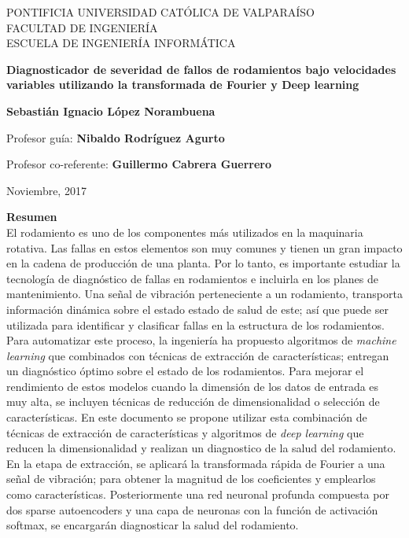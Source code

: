 \documentclass[12pt]{article}%
\begin{document}
\thispagestyle{empty}

\begin{center}
PONTIFICIA UNIVERSIDAD CATÓLICA DE VALPARAÍSO\\
FACULTAD DE INGENIERÍA\\
ESCUELA DE INGENIERÍA INFORMÁTICA\\

\vspace{4cm}

\Large{\textbf{Diagnosticador de severidad de fallos de rodamientos bajo velocidades variables utilizando la transformada de Fourier y Deep learning}}

\vspace{3cm}

\normalsize{\textbf{Sebastián Ignacio López Norambuena}}\\
\end{center}

\vspace{3cm}
\begin{center} 
Profesor guía: \textbf{Nibaldo Rodríguez Agurto}
\end{center}
\begin{center} 
Profesor co-referente: \textbf{Guillermo Cabrera Guerrero}
\end{center}
\vspace{1cm}
\begin{center} 
Noviembre, 2017
\end{center}
\newpage
{}

\noindent
\Large{\textbf{Resumen}}\\

\normalsize
\noindent El rodamiento es uno de los componentes más utilizados en la maquinaria rotativa. Las fallas en estos elementos son muy comunes y tienen un gran impacto en la cadena de producción de una planta. Por lo tanto, es importante estudiar la tecnología de diagnóstico de fallas en rodamientos e incluirla en los planes de mantenimiento. Una señal de vibración perteneciente a un rodamiento, transporta información dinámica sobre el estado estado de salud de este; así que puede ser utilizada para identificar y clasificar fallas en la estructura de los rodamientos. Para automatizar este proceso, la ingeniería ha propuesto algoritmos de \textit{machine learning} que combinados con técnicas de extracción de características; entregan un diagnóstico óptimo sobre el estado de los rodamientos. Para mejorar el rendimiento de estos modelos cuando la dimensión de los datos de entrada es muy alta, se incluyen técnicas de reducción de dimensionalidad o selección de características. En este documento se propone utilizar esta combinación de técnicas de extracción de características y algoritmos de \textit{deep learning} que reducen la dimensionalidad y realizan un diagnostico de la salud del rodamiento. En la etapa de extracción, se aplicará la transformada rápida de Fourier a una señal de vibración; para obtener la magnitud de los coeficientes y emplearlos como características. Posteriormente una red neuronal profunda compuesta por dos sparse autoencoders y una capa de neuronas con la función de activación softmax, se encargarán diagnosticar la salud del rodamiento.
\newline
\end{document}
